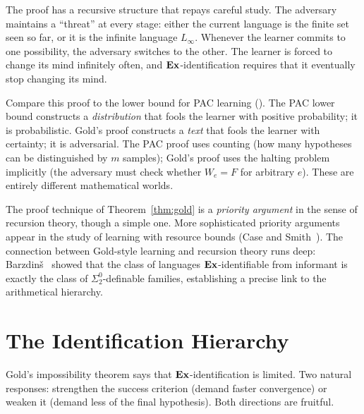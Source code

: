 The proof has a recursive structure that repays careful study. The adversary maintains a ``threat'' at every stage: either the current language is the finite set seen so far, or it is the infinite language $L_\infty$. Whenever the learner commits to one possibility, the adversary switches to the other. The learner is forced to change its mind infinitely often, and $\mathbf{Ex}$-identification requires that it eventually stop changing its mind.

\begin{remark}
\label{rmk:diag-vs-conc}
Compare this proof to the lower bound for PAC learning (). The PAC lower bound constructs a \emph{distribution} that fools the learner with positive probability; it is probabilistic. Gold's proof constructs a \emph{text} that fools the learner with certainty; it is adversarial. The PAC proof uses counting (how many hypotheses can be distinguished by $m$ samples); Gold's proof uses the halting problem implicitly (the adversary must check whether $W_e = F$ for arbitrary $e$). These are entirely different mathematical worlds.
\end{remark}

\begin{historical}
The proof technique of Theorem~\ref{thm:gold} is a \emph{priority argument} in the sense of recursion theory, though a simple one. More sophisticated priority arguments appear in the study of learning with resource bounds (Case and Smith~\cite{CaseSmith1983}). The connection between Gold-style learning and recursion theory runs deep: Barzdin\v{s}~\cite{Barzdinsh1974} showed that the class of languages $\mathbf{Ex}$-identifiable from informant is exactly the class of $\Sigma^0_2$-definable families, establishing a precise link to the arithmetical hierarchy.
\end{historical}


\section{The Identification Hierarchy}
\label{sec:hierarchy}

Gold's impossibility theorem says that $\mathbf{Ex}$-identification is limited. Two natural responses: strengthen the success criterion (demand faster convergence) or weaken it (demand less of the final hypothesis). Both directions are fruitful.

